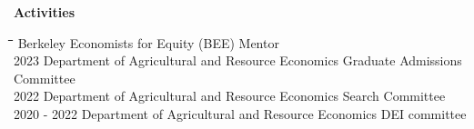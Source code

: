 \documentclass[10pt, oneside]{article}
\newcommand\mytabs{\hspace*{1cm}\=\hspace{1cm}\=\hspace{1cm}\=\hspace{1cm}\=\hspace{1cm}\=\hspace{1cm}\=\hspace{1cm}\=\hspace{1cm}\=\hspace{1cm}\=\hspace{1cm}}
\newenvironment{mysec}[1][\mytabs]
  {\begin{tabbing}#1\kill\ignorespaces}
  {\end{tabbing}}
\begin{document}
\begin{minipage}[t]{0.1\linewidth}
\textbf{Activities}
\end{minipage}\hspace{0.05\linewidth}
\begin{minipage}[t]{0.8\linewidth}
\begin{mysec}
    2024 \>\> Berkeley Economists for Equity (BEE) Mentor\\ 
    2023 \>\> Department of Agricultural and Resource Economics Graduate Admissions Committee \\
    2022 \>\> Department of Agricultural and Resource Economics Search Committee \\
    2020 - 2022 \>\> Department of Agricultural and Resource Economics DEI committee \\


\end{mysec}
\end{minipage}\vspace{5mm}

\begin{minipage}[t]{0.1\linewidth}
\textbf{}
\end{minipage}\hspace{0.05\linewidth}
\hspace{0.05\linewidth}
\begin{minipage}[t]{0.8\linewidth}


\end{minipage}\vspace{5mm}
\end{document}
